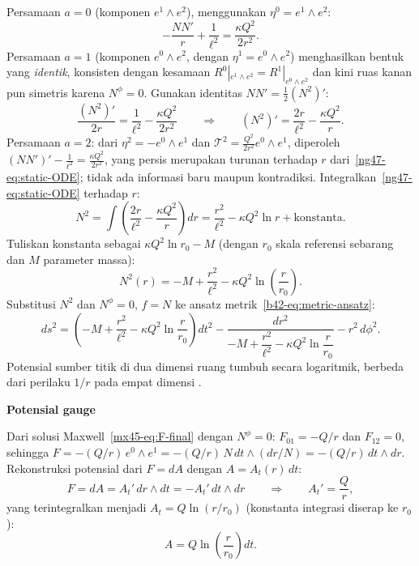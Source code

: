 Persamaan $a = 0$ (komponen $e^1 \wedge e^2$), menggunakan $\eta^0 = e^1 \wedge e^2$:
\begin{equation}
    -\frac{NN'}{r} + \frac{1}{\ell^2} = \frac{\kappa Q^2}{2r^2}.
\end{equation}
Persamaan $a = 1$ (komponen $e^0 \wedge e^2$, dengan $\eta^1 = e^0 \wedge e^2$) menghasilkan bentuk yang \emph{identik}, konsisten dengan kesamaan $R^0|_{e^1\wedge e^2} = R^1|_{e^0\wedge e^2}$ dan kini ruas kanan pun simetris karena $N^\phi = 0$. Gunakan identitas $NN' = \frac{1}{2}(N^2)'$:
\begin{equation}\label{ng47-eq:static-ODE}
    \frac{(N^2)'}{2r} = \frac{1}{\ell^2} - \frac{\kappa Q^2}{2r^2}
    \qquad\Longrightarrow\qquad
    (N^2)' = \frac{2r}{\ell^2} - \frac{\kappa Q^2}{r}.
\end{equation}
Persamaan $a = 2$: dari $\eta^2 = -e^0 \wedge e^1$ dan $\mathcal{T}^2 = \frac{Q^2}{2r^2}e^0 \wedge e^1$, diperoleh $(NN')' - \frac{1}{\ell^2} = \frac{\kappa Q^2}{2r^2}$, yang persis merupakan turunan terhadap $r$ dari~\eqref{ng47-eq:static-ODE}; tidak ada informasi baru maupun kontradiksi.
Integralkan~\eqref{ng47-eq:static-ODE} terhadap $r$:
\begin{equation}
    N^2 = \int\!\left(\frac{2r}{\ell^2} - \frac{\kappa Q^2}{r}\right)dr
    = \frac{r^2}{\ell^2} - \kappa Q^2\ln r + \text{konstanta}.
\end{equation}
Tuliskan konstanta sebagai $\kappa Q^2\ln r_0 - M$ (dengan $r_0$ skala referensi sebarang dan $M$ parameter massa):
\begin{equation}\label{ng47-eq:N2-charged}
    N^2(r) = -M + \frac{r^2}{\ell^2} - \kappa Q^2\ln\!\left(\frac{r}{r_0}\right).
\end{equation}
Substitusi $N^2$ dan $N^\phi = 0$, $f = N$ ke ansatz metrik~\eqref{b42-eq:metric-ansatz}:
\begin{equation}\label{ng47-eq:metric-charged}
    ds^2 = \left(-M + \frac{r^2}{\ell^2} - \kappa Q^2\ln\frac{r}{r_0}\right)dt^2
    - \frac{dr^2}{-M + \dfrac{r^2}{\ell^2} - \kappa Q^2\ln\dfrac{r}{r_0}}
    - r^2\,d\phi^2.
\end{equation}
Potensial sumber titik di dua dimensi ruang tumbuh secara logaritmik, berbeda dari perilaku $1/r$ pada empat dimensi \cite{cataldo1996, clement1993, garcia2017exact}.

\vspace{0.5em}
\noindent \textbf{Potensial gauge}

Dari solusi Maxwell~\eqref{mx45-eq:F-final} dengan $N^\phi = 0$: $F_{01} = -Q/r$ dan $F_{12} = 0$, sehingga $F = -(Q/r)\,e^0 \wedge e^1 = -(Q/r)\,N\,dt \wedge (dr/N) = -(Q/r)\,dt \wedge dr$. Rekonstruksi potensial dari $F = dA$ dengan $A = A_t(r)\,dt$:
\begin{equation}
    F = dA = A_t'\,dr \wedge dt = -A_t'\,dt \wedge dr
    \qquad\Longrightarrow\qquad
    A_t' = \frac{Q}{r},
\end{equation}
yang terintegralkan menjadi $A_t = Q\ln(r/r_0)$ (konstanta integrasi diserap ke $r_0$):
\begin{equation}\label{ng47-eq:gauge-static}
    A = Q\ln\!\left(\frac{r}{r_0}\right)dt.
\end{equation}


